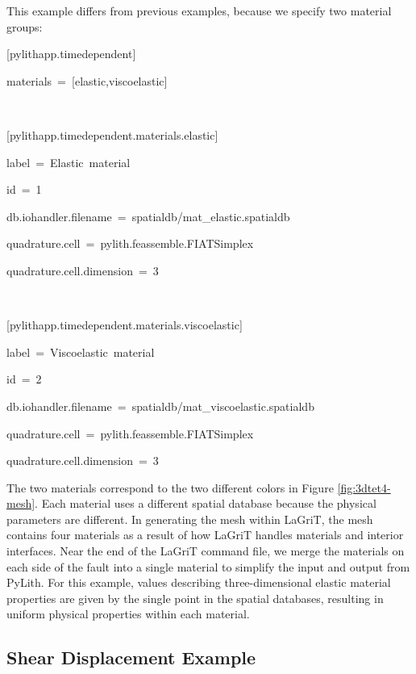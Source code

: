 This example differs from previous examples, because we specify two
material groups:
\begin{lyxcode}
{[}pylithapp.timedependent{]}

materials~=~{[}elastic,viscoelastic{]}

~

{[}pylithapp.timedependent.materials.elastic{]}

label~=~Elastic~material

id~=~1

db.iohandler.filename~=~spatialdb/mat\_elastic.spatialdb

quadrature.cell~=~pylith.feassemble.FIATSimplex

quadrature.cell.dimension~=~3

~

{[}pylithapp.timedependent.materials.viscoelastic{]}

label~=~Viscoelastic~material

id~=~2

db.iohandler.filename~=~spatialdb/mat\_viscoelastic.spatialdb

quadrature.cell~=~pylith.feassemble.FIATSimplex

quadrature.cell.dimension~=~3




\end{lyxcode}
The two materials correspond to the two different colors in Figure
\ref{fig:3dtet4-mesh}. Each material uses a different spatial database
because the physical parameters are different. In generating the mesh
within LaGriT, the mesh contains four materials as a result of how
LaGriT handles materials and interior interfaces. Near the end of
the LaGriT command file, we merge the materials on each side of the
fault into a single material to simplify the input and output from
PyLith. For this example, values describing three-dimensional elastic
material properties are given by the single point in the spatial databases,
resulting in uniform physical properties within each material.


\subsection{Shear Displacement Example}

